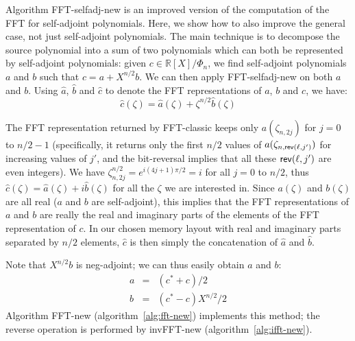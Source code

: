 \documentclass{llncs}
\newcommand{\bR}{\mathbb{R}}
\newcommand{\adj}[1]{{#1}^*}
\begin{document}
Algorithm \textsf{FFT-selfadj-new} is an improved version of the
computation of the FFT for self-adjoint polynomials. Here, we show how
to also improve the general case, not just self-adjoint polynomials. The
main technique is to decompose the source polynomial into a sum of two
polynomials which can both be represented by self-adjoint polynomials:
given $c\in\bR[X]/\Phi_n$, we find self-adjoint polynomials $a$ and $b$
such that $c = a + X^{n/2}b$. We can then apply \textsf{FFT-selfadj-new}
on both $a$ and $b$. Using $\hat a$, $\hat b$ and $\hat c$ to denote
the FFT representations of $a$, $b$ and $c$, we have:
\begin{equation*}
    {\hat c}(\zeta) = {\hat a}(\zeta) + \zeta^{n/2} {\hat b}(\zeta)
\end{equation*}

The FFT representation returned by \textsf{FFT-classic} keeps only
$a(\zeta_{n,2j})$ for $j = 0$ to $n/2 - 1$ (specifically, it returns
only the first $n/2$ values of $a(\zeta_{n,\text{\textsf{rev}}(\ell,j')})$
for increasing values of $j'$, and the bit-reversal implies that all
these $\text{\textsf{rev}}(\ell,j')$ are even integers). We have
$\zeta_{n,2j}^{n/2} = e^{i(4j+1)\pi/2} = i$ for all $j = 0$ to $n/2$,
thus ${\hat c}(\zeta) = {\hat a}(\zeta) + i {\hat b}(\zeta)$ for all the
$\zeta$ we are interested in. Since $a(\zeta)$ and $b(\zeta)$ are all
real ($a$ and $b$ are self-adjoint), this implies that the FFT
representations of $a$ and $b$ are really the real and imaginary parts
of the elements of the FFT representation of $c$. In our chosen memory
layout with real and imaginary parts separated by $n/2$ elements, ${\hat
c}$ is then simply the concatenation of ${\hat a}$ and ${\hat b}$.

Note that $X^{n/2}b$ is neg-adjoint; we can thus easily obtain $a$ and $b$:
\begin{eqnarray*}
    a &=& (\adj{c} + c)/2 \\
    b &=& (\adj{c} - c)X^{n/2}/2
\end{eqnarray*}
Algorithm \textsf{FFT-new} (algorithm~\ref{alg:fft-new}) implements
this method; the reverse operation is performed by \textsf{invFFT-new}
(algorithm~\ref{alg:ifft-new}).

\begin{algorithm}
    \caption{\ \ \textsf{FFT-new}\label{alg:fft-new}}
    \begin{algorithmic}[1]
        \Require{$c\in\bR[X]/\Phi_n$ such that $n = 2^\ell \geq 4$}
        \EndFor
        \EndFor
    \end{algorithmic}
\end{algorithm}
\end{document}
